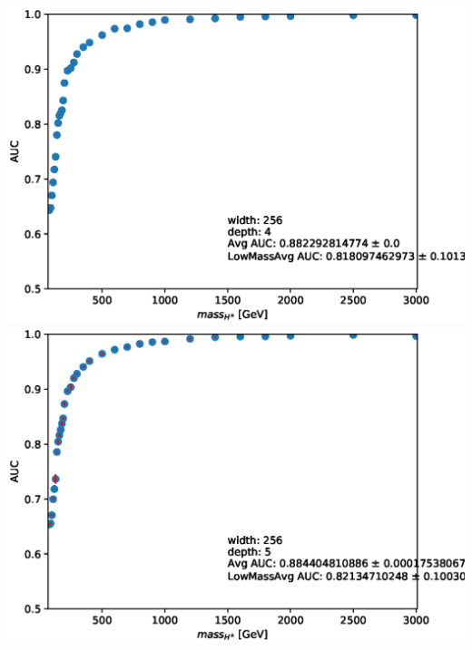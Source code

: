 \documentclass[aspectratio=169,xcolor=table]{beamer}
\begin{document}
\begin{frame}
\begin{columns}
      \includegraphics[height=.25\textheight,keepaspectratio=true]{AUC_Plots/model_GB_1024_channel_taulep_mass_80to3000_ntracks_1_nfolds_5_fold_4_nvars_19_batch_size_1024_epochs_1000_dense_layer_size_256_activation_function_LeakyRelu_depth_4_loss_binary_crossentropy_dropout_0.1_alpha_0.05.eps}
      \includegraphics[height=.25\textheight,keepaspectratio=true]{AUC_Plots/model_GB_1024_channel_taulep_mass_80to3000_ntracks_1_nfolds_5_fold_4_nvars_19_batch_size_1024_epochs_1000_dense_layer_size_256_activation_function_LeakyRelu_depth_5_loss_binary_crossentropy_dropout_0.1_alpha_0.05.eps}

      \end{columns}
    \end{frame}
\end{document}
